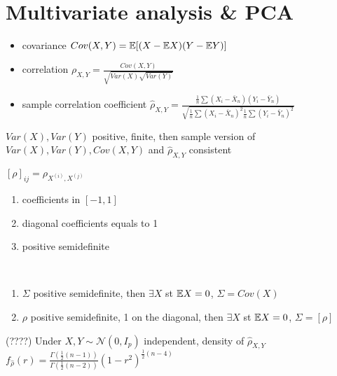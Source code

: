 \section{Multivariate analysis \& PCA}\label{sec:multivariate-analysis-&-pca}

\begin{itemize}
    \item covariance $Cov(X, Y) = \mathbb{E}[(X - \mathbb{E} X)(Y - \mathbb{E} Y)]$
    \item correlation $\rho_{X, Y} = \frac{Cov(X, Y)}{\sqrt{Var(X)\sqrt{Var(Y)}}}$
    \item sample correlation coefficient $\hat \rho_{X, Y} = \frac{\frac{1}{n}\sum (X_i - \bar X_n)(Y_i - \bar Y_n)}{\sqrt{\frac{1}{n}\sum (X_i - \bar{X}_n)^2 \frac{1}{n}\sum (Y_i - \bar{Y}_n)^2}}$
\end{itemize}

\begin{fact}
    $Var(X), Var(Y)$ positive, finite, then sample version of $Var(X), Var(Y), Cov(X, Y)$ and $\hat \rho_{X,Y}$ consistent
\end{fact}

\begin{fact}
    $[\rho]_{ij} = \rho_{X^{(i)}, X^{(j)}}$
    \begin{enumerate}
        \item coefficients in $[-1, 1]$
        \item diagonal coefficients equals to 1
        \item positive semidefinite
    \end{enumerate}
\end{fact}

\begin{prop}\,
    \begin{enumerate}
        \item $\Sigma$ positive semidefinite, then $\exists X$ st $\mathbb{E} X = 0$, $\Sigma = Cov(X)$
        \item $\rho$ positive semidefinite, 1 on the diagonal, then $\exists X$ st $\mathbb{E} X = 0$, $\Sigma = [\rho]$
    \end{enumerate}
\end{prop}

\begin{prop}(????)
    Under $X,Y \sim \mathcal{N}(0, I_p)$ independent, density of $\hat \rho_{X, Y}$ \\$f_{\hat \rho}(r) = \frac{\Gamma\left(\frac{1}{2}(n-1)\right)}{\Gamma\left(\frac{1}{2}(n-2)\right)}(1 - r^2)^{\frac{1}{2}(n - 4)}$
\end{prop}

